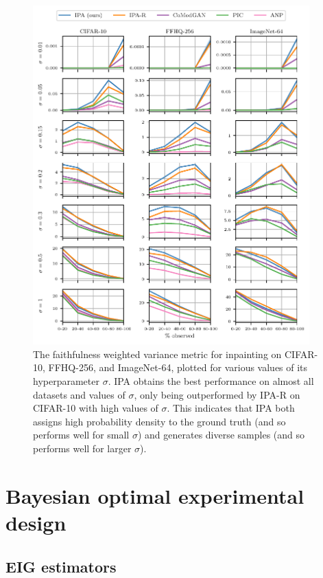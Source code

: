 \begin{figure}
  \includegraphics[width=0.95\textwidth]{figs/cigcvae/fwv_sigma}
  \caption{The faithfulness weighted variance metric for inpainting on CIFAR-10,
    FFHQ-256, and ImageNet-64, plotted for various values of its hyperparameter $\sigma$. IPA obtains the
    best performance on almost all datasets and values of $\sigma$, only being
    outperformed by IPA-R on CIFAR-10 with high values of $\sigma$. This
    indicates that IPA both assigns high probability density to the ground truth
    (and so performs well for small $\sigma$) and generates diverse samples (and
    so performs well for larger $\sigma$).}
  \label{fig:cigcvae-fwv}
\end{figure}



\section{Bayesian optimal experimental design} \label{sec:cigcvae-supp-boed}

\subsection{EIG estimators}  \label{sec:cigcvae-eig-estimator}

